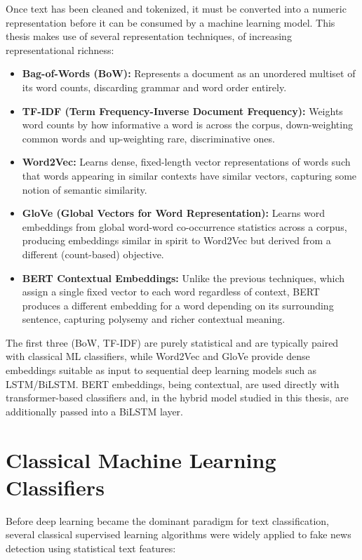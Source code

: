 Once text has been cleaned and tokenized, it must be converted into a numeric representation before it can be consumed by a machine learning model. This thesis makes use of several representation techniques, of increasing representational richness:

\begin{itemize}
\item \textbf{Bag-of-Words (BoW):} Represents a document as an unordered multiset of its word counts, discarding grammar and word order entirely.
\item \textbf{TF-IDF (Term Frequency-Inverse Document Frequency):} Weights word counts by how informative a word is across the corpus, down-weighting common words and up-weighting rare, discriminative ones.
\item \textbf{Word2Vec:} Learns dense, fixed-length vector representations of words such that words appearing in similar contexts have similar vectors, capturing some notion of semantic similarity.
\item \textbf{GloVe (Global Vectors for Word Representation):} Learns word embeddings from global word-word co-occurrence statistics across a corpus, producing embeddings similar in spirit to Word2Vec but derived from a different (count-based) objective.
\item \textbf{BERT Contextual Embeddings:} Unlike the previous techniques, which assign a single fixed vector to each word regardless of context, BERT produces a different embedding for a word depending on its surrounding sentence, capturing polysemy and richer contextual meaning.
\end{itemize}

The first three (BoW, TF-IDF) are purely statistical and are typically paired with classical ML classifiers, while Word2Vec and GloVe provide dense embeddings suitable as input to sequential deep learning models such as LSTM/BiLSTM. BERT embeddings, being contextual, are used directly with transformer-based classifiers and, in the hybrid model studied in this thesis, are additionally passed into a BiLSTM layer.

\section{Classical Machine Learning Classifiers}

Before deep learning became the dominant paradigm for text classification, several classical supervised learning algorithms were widely applied to fake news detection using statistical text features:

